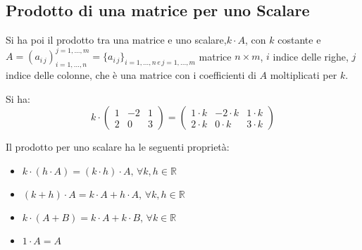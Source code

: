 \documentclass[a4paper,12pt, oneside]{book}
\begin{document}
\subsection{Prodotto di una matrice per uno Scalare}
Si ha poi il prodotto tra una matrice e uno scalare,$k\cdot A$, con $k$ costante e $A=(a_{i\,j})_{i=1,...,n}^{j=1,...,m}=\{a_{i\,j}\}_{i=1,...,n\, e \, j=1,...,m}$ matrice $n\times m$, $i$ indice delle righe, $j$ indice delle colonne, che è una matrice con i coefficienti di $A$ moltiplicati per $k$.
\begin{esempio}
Si ha:\\
$$k\cdot\left(\begin{matrix}
1 & -2 & 1\\
2 & 0 & 3
\end{matrix}\right)=
\left(\begin{matrix}
1\cdot k & -2\cdot k & 1\cdot k\\
2\cdot k & 0\cdot k & 3\cdot k
\end{matrix}\right)$$
\end{esempio}
Il prodotto per uno scalare ha le seguenti proprietà:
\begin{itemize}
\item $k\cdot(h\cdot A)=(k\cdot h)\cdot A,\, \forall k,h\in \mathbb{R}$
\item $(k+h)\cdot A=k\cdot A+ h\cdot A,\, \forall k,h\in \mathbb{R}$
\item $k\cdot(A+B)=k\cdot A+k\cdot B,\, \forall k\in \mathbb{R}$
\item $1\cdot A=A$
\end{itemize}
\end{document}
